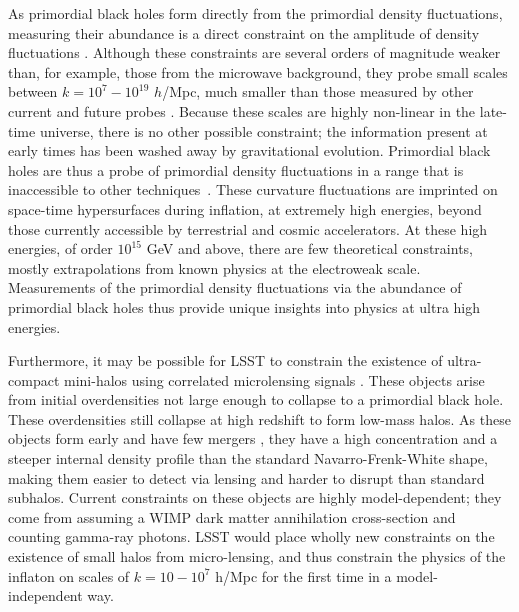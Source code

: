 As primordial black holes form directly from the primordial density fluctuations, measuring their abundance is a direct constraint on the amplitude of density fluctuations \citep{Clesse:2015}. Although these constraints are several orders of magnitude weaker than, for example, those from the microwave background, they probe small scales between $k = 10^{7} - 10^{19}$ $h$/Mpc, much smaller than those measured by other current and future probes \citep{Bringmann:2012}. Because these scales are highly non-linear in the late-time universe, there is no other possible constraint; the information present at early times has been washed away by gravitational evolution. Primordial black holes are thus a probe of primordial density fluctuations in a range that is inaccessible to other techniques~\citep{Bellido:2017,Bellido:2018}. These curvature fluctuations are imprinted on space-time hypersurfaces during inflation, at extremely high energies, beyond those currently accessible by terrestrial and cosmic accelerators. 
At these high energies, of order $10^{15}$ GeV and above, there are few theoretical constraints, mostly extrapolations from known physics at the electroweak scale. Measurements of the primordial density fluctuations via the abundance of primordial black holes thus provide unique insights into physics at ultra high energies. %


Furthermore, it may be possible for LSST to constrain the existence of ultra-compact mini-halos using correlated microlensing signals \citep{erickcek2011,li2012}. These objects arise from initial overdensities not large enough to collapse to a primordial black hole. These overdensities still collapse at high redshift to form low-mass halos. As these objects form early and have few mergers \citep{Bringmann:2012t,Delos:2018}, they have a high concentration and a steeper internal density profile than the standard Navarro-Frenk-White shape, making them easier to detect via lensing and harder to disrupt than standard subhalos. Current constraints on these objects are highly model-dependent; they come from assuming a WIMP dark matter annihilation cross-section and counting gamma-ray photons. LSST would place wholly new constraints on the existence of small halos from micro-lensing, and thus constrain the physics of the inflaton on scales of $k = 10 - 10^7 $ h/Mpc for the first time in a model-independent way.

